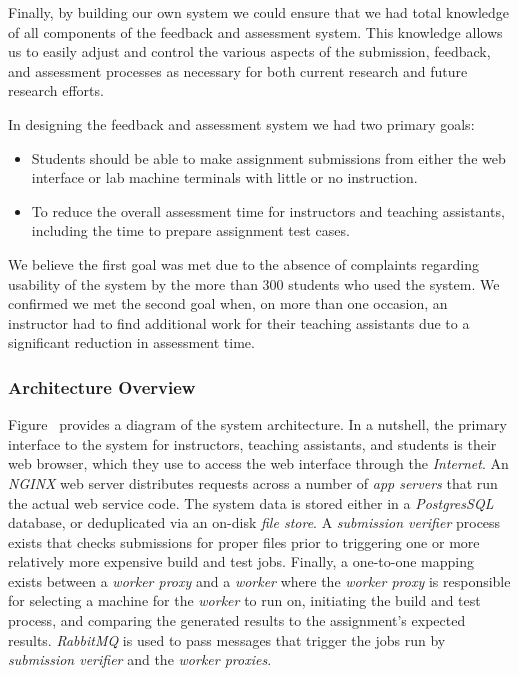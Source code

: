 Finally, by building our own system we could ensure that we had total knowledge
of all components of the feedback and assessment system. This knowledge allows
us to easily adjust and control the various aspects of the submission,
feedback, and assessment processes as necessary for both current research and
future research efforts.

In designing the feedback and assessment system we had two primary goals:

\begin{itemize}
\item Students should be able to make assignment submissions from either the
  web interface or lab machine terminals with little or no instruction.
\item To reduce the overall assessment time for instructors and teaching
  assistants, including the time to prepare assignment test cases.
\end{itemize}

We believe the first goal was met due to the absence of complaints regarding
usability of the system by the more than 300 students who used the system. We
confirmed we met the second goal when, on more than one occasion, an instructor
had to find additional work for their teaching assistants due to a significant
reduction in assessment time.


\subsubsection{Architecture Overview}
Figure~ provides a diagram of the system
architecture. In a nutshell, the primary interface to the system for
instructors, teaching assistants, and students is their web browser, which they
use to access the web interface through the \emph{Internet}. An \emph{NGINX}
web server distributes requests across a number of \emph{app servers} that run
the actual web service code. The system data is stored either in a
\emph{PostgresSQL} database, or deduplicated via an on-disk \emph{file
  store}. A \emph{submission verifier} process exists that checks submissions
for proper files prior to triggering one or more relatively more expensive
build and test jobs. Finally, a one-to-one mapping exists between a
\emph{worker proxy} and a \emph{worker} where the \emph{worker proxy} is
responsible for selecting a machine for the \emph{worker} to run on, initiating
the build and test process, and comparing the generated results to the
assignment's expected results. \emph{RabbitMQ} is used to pass messages that
trigger the jobs run by \emph{submission verifier} and the \emph{worker
  proxies}.

